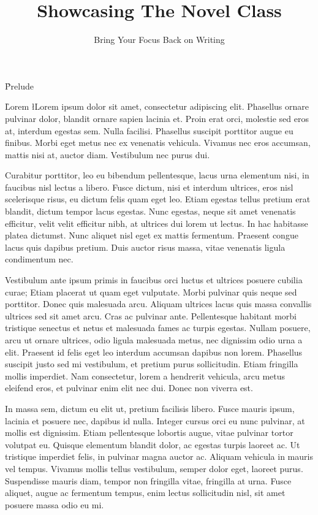 \documentclass{novel}
\title     {Showcasing The Novel Class}
\subtitle  {Bring Your Focus Back on Writing}
\begin{document}
\h*{Prelude}

\toc

\h{Lorem}
\l{L}orem ipsum dolor sit amet, consectetur adipiscing elit. Phasellus ornare pulvinar dolor, blandit ornare sapien lacinia et. Proin erat orci, molestie sed eros at, interdum egestas sem. Nulla facilisi. Phasellus suscipit porttitor augue eu finibus. Morbi eget metus nec ex venenatis vehicula. Vivamus nec eros accumsan, mattis nisi at, auctor diam. Vestibulum nec purus dui.

Curabitur porttitor, leo eu bibendum pellentesque, lacus urna elementum nisi, in faucibus nisl lectus a libero. Fusce dictum, nisi et interdum ultrices, eros nisl scelerisque risus, eu dictum felis quam eget leo. Etiam egestas tellus pretium erat blandit, dictum tempor lacus egestas. Nunc egestas, neque sit amet venenatis efficitur, velit velit efficitur nibh, at ultrices dui lorem ut lectus. In hac habitasse platea dictumst. Nunc aliquet nisl eget ex mattis fermentum. Praesent congue lacus quis dapibus pretium. Duis auctor risus massa, vitae venenatis ligula condimentum nec.

Vestibulum ante ipsum primis in faucibus orci luctus et ultrices posuere cubilia curae; Etiam placerat ut quam eget vulputate. Morbi pulvinar quis neque sed porttitor. Donec quis malesuada arcu. Aliquam ultrices lacus quis massa convallis ultrices sed sit amet arcu. Cras ac pulvinar ante. Pellentesque habitant morbi tristique senectus et netus et malesuada fames ac turpis egestas. Nullam posuere, arcu ut ornare ultrices, odio ligula malesuada metus, nec dignissim odio urna a elit. Praesent id felis eget leo interdum accumsan dapibus non lorem. Phasellus suscipit justo sed mi vestibulum, et pretium purus sollicitudin. Etiam fringilla mollis imperdiet. Nam consectetur, lorem a hendrerit vehicula, arcu metus eleifend eros, et pulvinar enim elit nec dui. Donec non viverra est.

In massa sem, dictum eu elit ut, pretium facilisis libero. Fusce mauris ipsum, lacinia et posuere nec, dapibus id nulla. Integer cursus orci eu nunc pulvinar, at mollis est dignissim. Etiam pellentesque lobortis augue, vitae pulvinar tortor volutpat eu. Quisque elementum blandit dolor, ac egestas turpis laoreet ac. Ut tristique imperdiet felis, in pulvinar magna auctor ac. Aliquam vehicula in mauris vel tempus. Vivamus mollis tellus vestibulum, semper dolor eget, laoreet purus. Suspendisse mauris diam, tempor non fringilla vitae, fringilla at urna. Fusce aliquet, augue ac fermentum tempus, enim lectus sollicitudin nisl, sit amet posuere massa odio eu mi.
\end{document}
